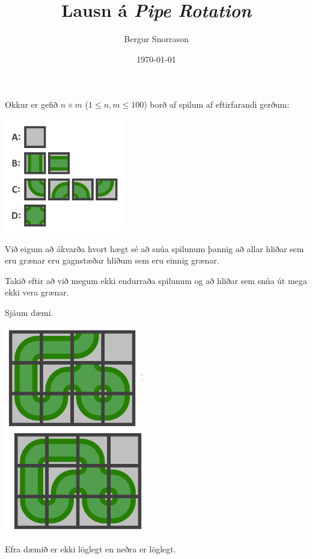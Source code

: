 \title{Lausn á \emph{Pipe Rotation}}
\author{Bergur Snorrason}
\date{\today}



\frame{\titlepage}

{
	{
		\item<1-> Okkur er gefið $n \times m$ ($1 \leq n, m \leq 100$) borð af spilum af eftirfarandi gerðum:
		\item<2->[] \includegraphics[scale = 0.25]{fig/pr1}
		\item<3-> Við eigum að ákvarða hvort hægt sé að snúa spilunum þannig að allar hliðar sem eru grænar eru gagnstæðar hliðum sem eru einnig grænar.
		\item<4-> Takið eftir að við megum ekki endurraða spilunum og að hliðar sem snúa út mega ekki vera grænar.
	}
}

{
	{
		\item<1-> Sjáum dæmi.
		\item<2->[] \includegraphics[scale = 0.25]{fig/pr2}
		\item<3-> Efra dæmið er ekki löglegt en neðra er löglegt.
	}
}

